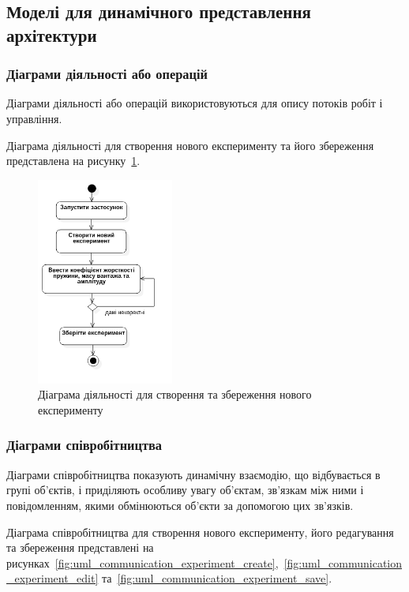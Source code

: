 \subsection{Моделі для динамічного представлення архітектури}
\subsubsection{Діаграми діяльності або операцій}
Діаграми діяльності або операцій використовуються для опису потоків робіт і управління.

Діаграма діяльності для створення нового експерименту та його збереження представлена на рисунку~\ref{fig:uml_activity_experiment}.

\begin{figure}[H]
  \centering
    \includegraphics[width=0.4\textwidth]{uml_activity_experiment}
  \caption{Діаграма діяльності для створення та збереження нового експерименту}
  \label{fig:uml_activity_experiment}
\end{figure}

\subsubsection{Діаграми співробітництва}
Діаграми співробітництва показують динамічну взаємодію, що відбувається в групі об'єктів, і приділяють особливу увагу об'єктам, зв'язкам між ними і повідомленням, якими обмінюються об'єкти за допомогою цих зв'язків.

Діаграма співробітництва для створення нового експерименту, його редагування та збереження представлені на рисунках~\ref{fig:uml_communication_experiment_create},~\ref{fig:uml_communication_experiment_edit} та~\ref{fig:uml_communication_experiment_save}.

